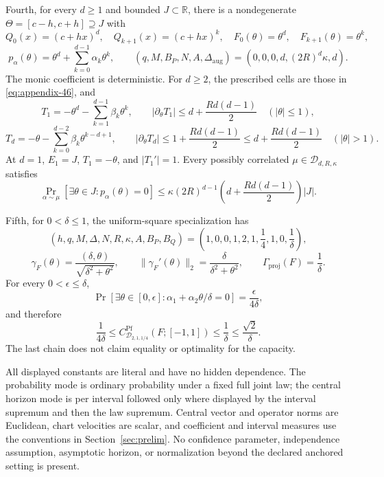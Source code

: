 \begin{proposition}
Fourth, for every $d\geq1$ and bounded $J\subset\mathbb R$, there is a
nondegenerate $\Theta=[c-h,c+h]\supseteq J$ with
\[
Q_0(x)=(c+hx)^d,
\quad Q_{k+1}(x)=(c+hx)^k,
\quad F_0(\theta)=\theta^d,
\quad F_{k+1}(\theta)=\theta^k,
\]
\begin{equation}
p_\alpha(\theta)=\theta^d+\sum_{k=0}^{d-1}\alpha_k\theta^k,
\qquad
(q,M,B_P,N,A,\Delta_{\mathrm{aug}})
=(0,0,0,d,(2R)^d\kappa,d).
\label{eq:appendix-83}
\end{equation}
The monic coefficient is deterministic.  For $d\geq2$, the prescribed cells
are those in \eqref{eq:appendix-46}, and
\begin{equation}
T_1=-\theta^d-\sum_{k=1}^{d-1}\beta_k\theta^k,
\qquad
|\partial_\theta T_1|
\leq d+\frac{Rd(d-1)}2
\quad(|\theta|\leq1),
\label{eq:appendix-84}
\end{equation}
\begin{equation}
T_d=-\theta-\sum_{k=0}^{d-2}\beta_k\theta^{k-d+1},
\qquad
|\partial_\theta T_d|
\leq1+\frac{Rd(d-1)}2
\leq d+\frac{Rd(d-1)}2
\quad(|\theta|>1).
\label{eq:appendix-85}
\end{equation}
At $d=1$, $E_1=J$, $T_1=-\theta$, and $|T_1'|=1$.  Every possibly
correlated $\mu\in\mathcal D_{d,R,\kappa}$ satisfies
\begin{equation}
\Pr_{\alpha\sim\mu}
[\exists\theta\in J:p_\alpha(\theta)=0]
\leq\kappa(2R)^{d-1}
\left(d+\frac{Rd(d-1)}2\right)|J|.
\label{eq:appendix-86}
\end{equation}

Fifth, for $0<\delta\leq1$, the uniform-square specialization has
\[
(h,q,M,\Delta,N,R,\kappa,A,B_P,B_Q)
=\left(1,0,0,1,2,1,\frac14,1,0,\frac1\delta\right),
\]
\begin{equation}
\gamma_F(\theta)
=\frac{(\delta,\theta)}{\sqrt{\delta^2+\theta^2}},
\qquad
\|\gamma_F'(\theta)\|_2
=\frac{\delta}{\delta^2+\theta^2},
\qquad
\Gamma_{\mathrm{proj}}(F)=\frac1\delta.
\label{eq:appendix-87}
\end{equation}
For every $0<\epsilon\leq\delta$,
\begin{equation}
\Pr[\exists\theta\in[0,\epsilon]:
 \alpha_1+\alpha_2\theta/\delta=0]
=\frac{\epsilon}{4\delta},
\label{eq:appendix-88}
\end{equation}
and therefore
\begin{equation}
\frac1{4\delta}
\leq C^{\mathrm{Pf}}_{\mathcal D_{2,1,1/4}}(F;[-1,1])
\leq\frac1\delta
\leq\frac{\sqrt2}{\delta}.
\label{eq:appendix-89}
\end{equation}
The last chain does not claim equality or optimality for the capacity.

All displayed constants are literal and have no hidden dependence.  The
probability mode is ordinary probability under a fixed full joint law; the
central horizon mode is per interval followed only where displayed by the
interval supremum and then the law supremum.  Central vector and operator
norms are Euclidean, chart velocities are scalar, and coefficient and
interval measures use the conventions in Section~\ref{sec:prelim}.  No confidence
parameter, independence assumption, asymptotic horizon, or normalization
beyond the declared anchored setting is present.
\end{proposition}

